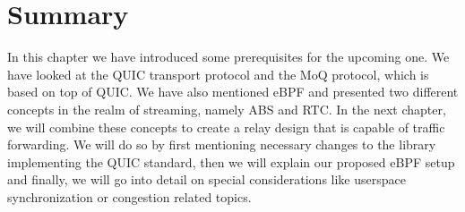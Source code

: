\section{Summary}\label{sec:summary_ch2}

In this chapter we have introduced some prerequisites for the 
upcoming one.
We have looked at the QUIC transport protocol and the MoQ protocol, which is 
based on top of QUIC\@.
We have also mentioned eBPF and presented two different concepts in the 
realm of streaming, namely ABS and RTC\@.
In the next chapter, we will combine these concepts to create a 
relay design that is capable of traffic forwarding.
We will do so by first mentioning necessary changes to the library 
implementing the QUIC standard, then we will explain our proposed eBPF setup 
and finally, we will go into detail on special considerations like 
userspace synchronization or congestion related topics.